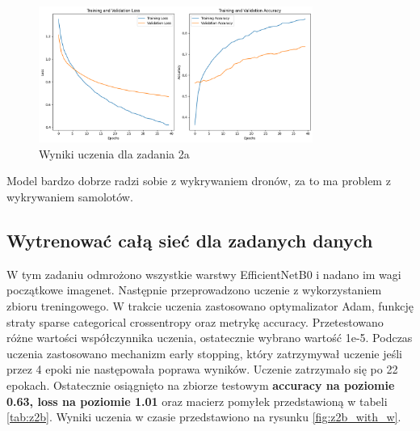 \begin{figure}[H]
    \centering
    \includegraphics[width=0.8\textwidth]{img/z2a.png}
    \caption{Wyniki uczenia dla zadania 2a}
    \label{fig:z2a}
\end{figure}


Model bardzo dobrze radzi sobie z wykrywaniem dronów, za to ma problem z wykrywaniem samolotów.




\subsection{Wytrenować całą sieć dla zadanych danych}
W tym zadaniu odmrożono wszystkie warstwy EfficientNetB0 i nadano im wagi początkowe imagenet. Następnie przeprowadzono uczenie z wykorzystaniem zbioru treningowego. W trakcie uczenia zastosowano optymalizator Adam, funkcję straty sparse categorical crossentropy oraz metrykę accuracy. Przetestowano różne wartości współczynnika uczenia, ostatecznie wybrano wartość 1e-5. Podczas uczenia zastosowano mechanizm early stopping, który zatrzymywał uczenie jeśli przez 4 epoki nie następowała poprawa wyników. Uczenie zatrzymało się po 22 epokach. Ostatecznie osiągnięto na zbiorze testowym \textbf{accuracy na poziomie 0.63, loss na poziomie 1.01} oraz macierz pomyłek przedstawioną w tabeli \ref{tab:z2b}. Wyniki uczenia w czasie przedstawiono na rysunku \ref{fig:z2b_with_w}.



